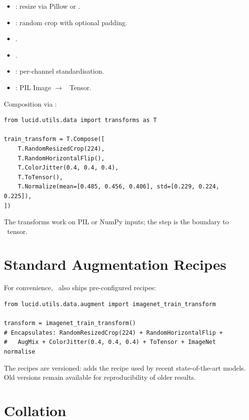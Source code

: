 \begin{itemize}
  \item {}: resize via Pillow or
    .
  \item {}: random crop with optional
    padding.
  \item {}.
  \item {}.
  \item {}: per-channel
    standardisation.
  \item {}: PIL Image $\to$ \Lucid\ Tensor.
\end{itemize}

Composition via :

\begin{lstlisting}[style=lucid,language=LucidPython]
from lucid.utils.data import transforms as T

train_transform = T.Compose([
    T.RandomResizedCrop(224),
    T.RandomHorizontalFlip(),
    T.ColorJitter(0.4, 0.4, 0.4),
    T.ToTensor(),
    T.Normalize(mean=[0.485, 0.456, 0.406], std=[0.229, 0.224, 0.225]),
])
\end{lstlisting}

The transforms work on PIL or NumPy inputs; the
 step is the boundary to \Lucid\ tensor.

\section{Standard Augmentation Recipes}
\label{sec:data_pipeline:augmentation_recipes}

For convenience, \Lucid\ also ships pre-configured recipes:

\begin{lstlisting}[style=lucid,language=LucidPython]
from lucid.utils.data.augment import imagenet_train_transform

transform = imagenet_train_transform()
# Encapsulates: RandomResizedCrop(224) + RandomHorizontalFlip +
#   AugMix + ColorJitter(0.4, 0.4, 0.4) + ToTensor + ImageNet normalise
\end{lstlisting}

The recipes are versioned: 
adds the recipe used by recent state-of-the-art models. Old
versions remain available for reproducibility of older results.

\section{Collation}
\label{sec:data_pipeline:collation}

